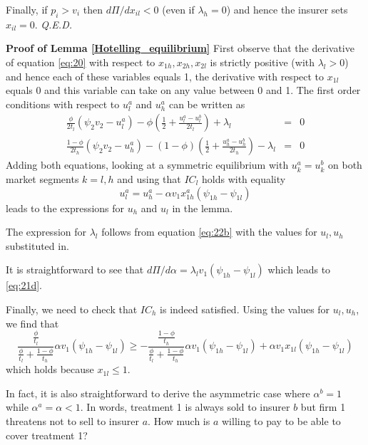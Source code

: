 \documentclass[12pt,english,a4paper]{article}
\newcommand{\qed}{\hspace*{\fill} {\em Q.E.D.}}
\begin{document}
Finally, if \(p_i > v_i\) then \(d\Pi/dx_{il} <0\) (even if \(\lambda_h =0\)) and hence the insurer sets \(x_{il}=0\). 
 \qed


\textbf{Proof of Lemma \ref{Hotelling_equilibrium}}
First observe that the derivative of equation \eqref{eq:20} with respect to \(x_{1h},x_{2h},x_{2l}\) is strictly positive (with \(\lambda_l >0\)) and hence each of these variables equals 1, the derivative with respect to \(x_{1l}\) equals 0 and this variable can take on any value between 0 and 1. The first order conditions with respect to \(u_l^a\) and \(u_h^a\) can be written as
\begin{eqnarray}
\label{eq:22}
\frac{\phi}{2t_l}(\psi_2 v_2 - u_l^a) - \phi(\frac{1}{2} + \frac{u_l^a-u_l^b}{2t_l}) + \lambda_{l}  &=&0 \\
\label{eq:22b}
\frac{1-\phi}{2t_h}(\psi_2 v_2 - u_h^a) - (1-\phi)(\frac{1}{2} + \frac{u_h^a-u_h^b}{2t_h}) - \lambda_{l}  &=&0
\end{eqnarray}
Adding both equations, looking at a symmetric equilibrium with \(u_k^a=u_k^b\) on both market segments \(k=l,h\)  and using that \(IC_l\) holds with equality
\begin{equation}
\label{eq:23}
u_l^a = u_h^a - \alpha v_1 x_{1h}^a (\psi_{1h}-\psi_{1l})
\end{equation}
leads to the expressions for \(u_h\) and \(u_l\) in the lemma.

The expression for \(\lambda_{l}\) follows from equation \eqref{eq:22b} with the values for \(u_l,u_h\) substituted in.

It is straightforward to see that \(d\Pi/d\alpha = \lambda_{l} v_1 (\psi_{1h}-\psi_{1l})\) which leads to \eqref{eq:21d}.

Finally, we need to check that \(IC_h\) is indeed satisfied. Using the values for \(u_l,u_h\), we find that
\begin{equation}
\label{eq:24}
\frac{\frac{\phi}{t_l}}{\frac{\phi}{t_l}+\frac{1-\phi}{t_h}}\alpha v_1 (\psi_{1h}-\psi_{1l}) \geq -\frac{\frac{1-\phi}{t_h}}{\frac{\phi}{t_l}+\frac{1-\phi}{t_h}}\alpha v_1 (\psi_{1h}-\psi_{1l}) + \alpha v_1 x_{1l} (\psi_{1h}-\psi_{1l})
\end{equation}
which holds because \(x_{1l} \leq 1\).

In fact, it is also straightforward to derive the asymmetric case where \(\alpha^b =1\) while \(\alpha^a = \alpha <1\). In words, treatment 1 is always sold to insurer \(b\) but firm 1 threatens not to sell to insurer \(a\). How much is \(a\) willing to pay to be able to cover treatment 1?
\end{document}
